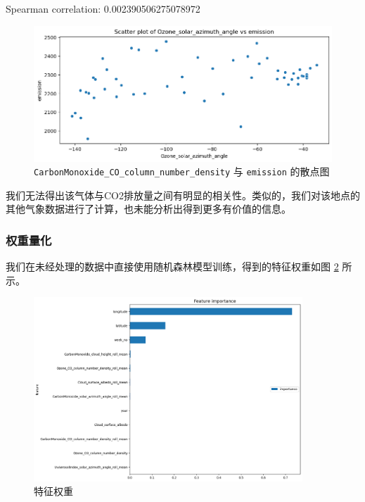 \documentclass{ctexart}
\begin{document}
\begin{sloppypar}
\begin{center}
      Spearman correlation: 0.002390506275078972
\end{center}

\begin{figure}[H]
      \centering
      \includegraphics[width=1\textwidth]{output7.png}
      \caption{\texttt{CarbonMonoxide\_CO\_column\_number\_density} 与 \texttt{emission} 的散点图}
      \label{fig:7}
\end{figure}

我们无法得出该气体与CO2排放量之间有明显的相关性。类似的，我们对该地点的其他气象数据进行了计算，也未能分析出得到更多有价值的信息。

\subsubsection{权重量化}

我们在未经处理的数据中直接使用随机森林模型训练，得到的特征权重如图 \ref{fig:11} 所示。

\begin{figure}[H]
      \centering
      \includegraphics[width=0.9\textwidth]{output11.png}
      \caption{特征权重}
      \label{fig:11}
\end{figure}


\end{sloppypar}
\end{document}
